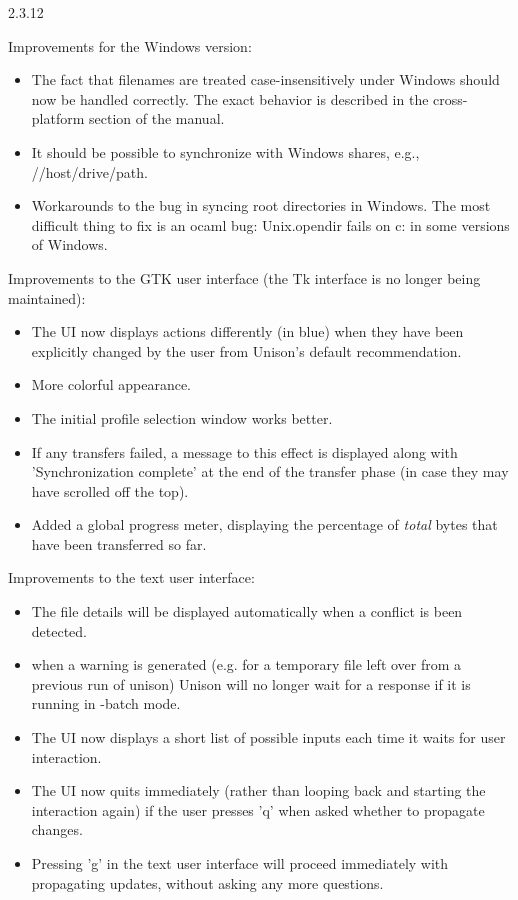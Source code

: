 \begin{changesfromversion}{2.3.12}
\item Improvements for the Windows version:
\begin{itemize}
\item The fact that filenames are treated case-insensitively under
Windows should now be handled correctly.  The exact behavior is described
in the cross-platform section of the manual.
\item It should be possible to synchronize with Windows shares, e.g.,
  //host/drive/path.
\item Workarounds to the bug in syncing root directories in Windows.
The most difficult thing to fix is an ocaml bug: Unix.opendir fails on
c: in some versions of Windows.
\end{itemize}

\item Improvements to the GTK user interface (the Tk interface is no
longer being maintained):
\begin{itemize}
\item The UI now displays actions differently (in blue) when they have been
  explicitly changed by the user from Unison's default recommendation.
\item More colorful appearance.
\item The initial profile selection window works better.
\item If any transfers failed, a message to this effect is displayed along with
  'Synchronization complete' at the end of the transfer phase (in case they
  may have scrolled off the top).
\item Added a global progress meter, displaying the percentage of {\em total}
  bytes that have been transferred so far.
\end{itemize}

\item Improvements to the text user interface:
\begin{itemize}
\item The file details will be displayed automatically when a
  conflict is been detected.
\item when a warning is generated (e.g. for a temporary
  file left over from a previous run of unison) Unison will no longer
  wait for a response if it is running in -batch mode.
\item The UI now displays a short list of possible inputs each time it waits
  for user interaction.
\item The UI now quits immediately (rather than looping back and starting
  the interaction again) if the user presses 'q' when asked whether to
  propagate changes.
\item Pressing 'g' in the text user interface will proceed immediately
  with propagating updates, without asking any more questions.
\end{itemize}


\end{changesfromversion}

